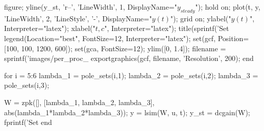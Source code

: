 \begin{matlabcode}
    figure;
    yline(y_st, 'r--', 'LineWidth', 1, DisplayName="$y_{steady}$");
    hold on;
    plot(t, y, 'LineWidth', 2, 'LineStyle', '-', DisplayName="$y(t)$");
    grid on;
    ylabel("$y(t)$", Interpreter="latex");
    xlabel("$t, c$", Interpreter="latex");
    title(sprintf('Set %
    legend(Location="best", FontSize=12, Interpreter="latex");
    set(gcf, Position=[100, 100, 1200, 600]);
    set(gca, FontSize=12);
    ylim([0, 1.4]);
    filename = sprintf('images/per_proc_%
    exportgraphics(gcf, filename, 'Resolution', 200);
end

for i = 5:6
    lambda_1 = pole_sets(i,1);
    lambda_2 = pole_sets(i,2);
    lambda_3 = pole_sets(i,3);

    W = zpk([], [lambda_1, lambda_2, lambda_3], abs(lambda_1*lambda_2*lambda_3));
    y = lsim(W, u, t);
    y_st = dcgain(W);
    fprintf('Set %
end


\end{matlabcode}
